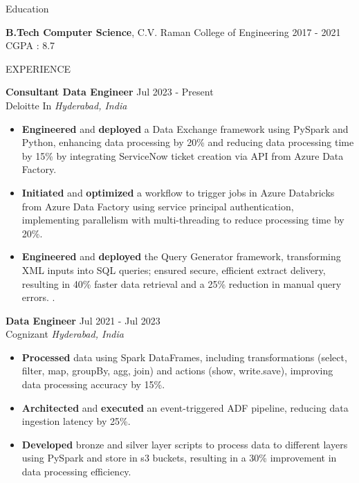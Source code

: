 \documentclass{resume} %
\begin{document}
\begin{rSection}{Education}

{\bf B.Tech Computer Science}, C.V. Raman College of Engineering   \hfill {2017 - 2021 }\\
CGPA : 8.7 
\end{rSection}
\begin{rSection}{EXPERIENCE}

\textbf{Consultant Data Engineer} \hfill Jul 2023 - Present\\
Deloitte In \hfill \textit{Hyderabad, India}
 \begin{itemize}
    \itemsep -3pt {} 
    \item \textbf{Engineered} and \textbf{deployed} a Data Exchange framework using PySpark and Python, enhancing data processing by 20\% and reducing data processing time by 15\% by integrating ServiceNow ticket creation via API from Azure Data Factory.
    \item \textbf{Initiated} and \textbf{optimized} a workflow to trigger jobs in Azure Databricks from Azure Data Factory using service principal authentication, implementing parallelism with multi-threading to reduce processing time by 20\%.
    \item {\textbf{Engineered}} and {\textbf{deployed}} the Query Generator framework, transforming XML inputs into SQL queries; ensured secure, efficient extract delivery, resulting in 40\% faster data retrieval and a 25\% reduction in manual query errors. . 

 \end{itemize}
 
\textbf{Data Engineer } \hfill Jul 2021 - Jul 2023\\
Cognizant \hfill \textit{Hyderabad, India}
 \begin{itemize}
    \itemsep -3pt {}
    \item \textbf{Processed} data using Spark DataFrames, including transformations (select, filter, map, groupBy, agg, join) and actions (show, write.save), improving data processing accuracy by 15\%.
    \item \textbf{Architected} and \textbf{executed} an event-triggered ADF pipeline, reducing data ingestion latency by 25\%. 
    \item \textbf{Developed} bronze and silver layer scripts to process data to different layers using PySpark and store in s3 buckets, resulting in a 30\% improvement in data processing efficiency. 
\end{itemize}

\end{rSection} 
\end{document}
